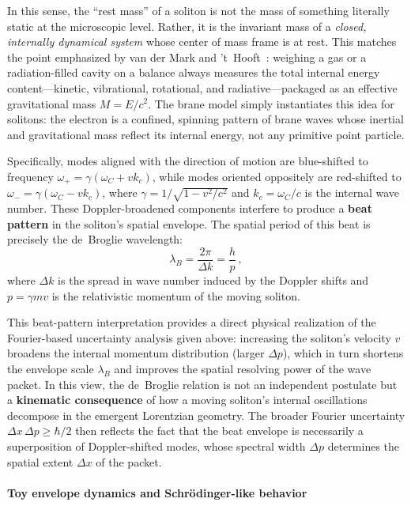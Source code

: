 In this sense, the ``rest mass'' of a soliton is not the mass of
something literally static at the microscopic level. Rather, it is the
invariant mass of a \emph{closed, internally dynamical system} whose
center of mass frame is at rest. This matches the point emphasized by
van der Mark and 't~Hooft~\cite{vanderMark2000LightHeavy}: weighing a
gas or a radiation-filled cavity on a balance always measures the total
internal energy content---kinetic, vibrational, rotational, and
radiative---packaged as an effective gravitational mass $M = E/c^2$.
The brane model simply instantiates this idea for solitons: the electron
is a confined, spinning pattern of brane waves whose inertial and
gravitational mass reflect its internal energy, not any primitive point
particle.

Specifically, modes aligned with the direction of motion are blue-shifted
to frequency $\omega_+ = \gamma(\omega_C + v k_c)$, while modes oriented
oppositely are red-shifted to $\omega_- = \gamma(\omega_C - v k_c)$, where
$\gamma = 1/\sqrt{1 - v^2/c^2}$ and $k_c = \omega_C/c$ is the internal
wave number. These Doppler-broadened components interfere to produce a
\textbf{beat pattern} in the soliton's spatial envelope. The spatial
period of this beat is precisely the de~Broglie wavelength:
\[
  \lambda_B = \frac{2\pi}{\Delta k} = \frac{h}{p}\,,
\]
where $\Delta k$ is the spread in wave number induced by the Doppler shifts
and $p = \gamma m v$ is the relativistic momentum of the moving soliton.

This beat-pattern interpretation provides a direct physical realization of
the Fourier-based uncertainty analysis given above: increasing the
soliton's velocity $v$ broadens the internal momentum distribution
(larger $\Delta p$), which in turn shortens the envelope scale
$\lambda_B$ and improves the spatial resolving power of the wave packet.
In this view, the de~Broglie relation is not an independent postulate but
a \textbf{kinematic consequence} of how a moving soliton's internal
oscillations decompose in the emergent Lorentzian geometry. The broader
Fourier uncertainty $\Delta x\,\Delta p \geq \hbar/2$ then reflects the
fact that the beat envelope is necessarily a superposition of
Doppler-shifted modes, whose spectral width $\Delta p$ determines the
spatial extent $\Delta x$ of the packet.

\paragraph{Toy envelope dynamics and Schrödinger-like behavior}
\label{sec:toy-envelope-schroedinger}

